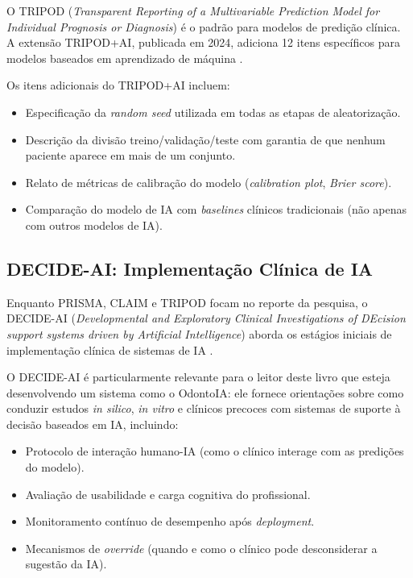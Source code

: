 O TRIPOD (\textit{Transparent Reporting of a Multivariable Prediction Model for
Individual Prognosis or Diagnosis}) é o padrão para modelos de predição clínica.
A extensão TRIPOD+AI, publicada em 2024, adiciona 12 itens específicos para
modelos baseados em aprendizado de máquina \cite{collins2024tripod}.

Os itens adicionais do TRIPOD+AI incluem:

\begin{itemize}
  \item Especificação da \textit{random seed} utilizada em todas as etapas de
    aleatorização.
  \item Descrição da divisão treino/validação/teste com garantia de que nenhum
    paciente aparece em mais de um conjunto.
  \item Relato de métricas de calibração do modelo (\textit{calibration plot},
    \textit{Brier score}).
  \item Comparação do modelo de IA com \textit{baselines} clínicos tradicionais
    (não apenas com outros modelos de IA).
\end{itemize}

\subsection{DECIDE-AI: Implementação Clínica de IA}

Enquanto PRISMA, CLAIM e TRIPOD focam no reporte da pesquisa, o DECIDE-AI
(\textit{Developmental and Exploratory Clinical Investigations of DEcision
support systems driven by Artificial Intelligence}) aborda os estágios iniciais
de implementação clínica de sistemas de IA \cite{vasey2021decide}.

O DECIDE-AI é particularmente relevante para o leitor deste livro que esteja
desenvolvendo um sistema como o OdontoIA: ele fornece orientações sobre como
conduzir estudos \textit{in silico}, \textit{in vitro} e clínicos precoces com
sistemas de suporte à decisão baseados em IA, incluindo:

\begin{itemize}
  \item Protocolo de interação humano-IA (como o clínico interage com as
    predições do modelo).
  \item Avaliação de usabilidade e carga cognitiva do profissional.
  \item Monitoramento contínuo de desempenho após \textit{deployment}.
  \item Mecanismos de \textit{override} (quando e como o clínico pode
    desconsiderar a sugestão da IA).
\end{itemize}

